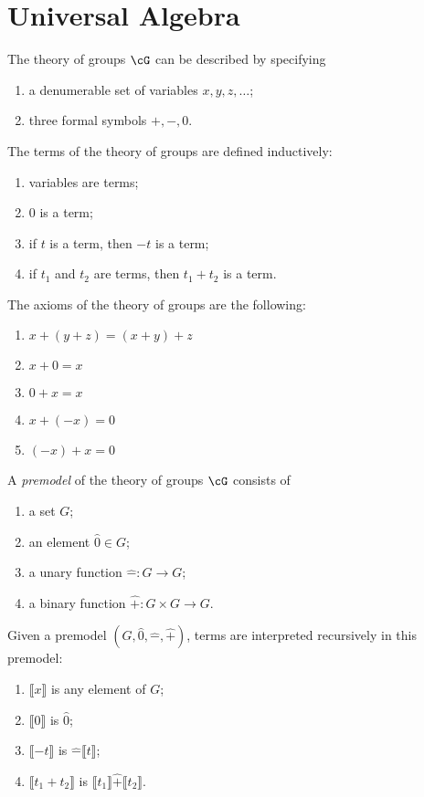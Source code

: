\documentclass{amsart}
\newcommand{\interp}[1]{\llbracket #1 \rrbracket}
\begin{document}
\section{Universal Algebra}
\label{sec:universal-algebra}

The theory of groups $\cG$ can be described by specifying
\begin{enumerate}
\item a denumerable set of variables $x, y, z, \ldots$;
\item three formal symbols $+, -, 0$.
\end{enumerate}

The terms of the theory of groups are defined inductively:
\begin{enumerate}
\item variables are terms;
\item $0$ is a term;
\item if $t$ is a term, then $-t$ is a term;
\item if $t_{1}$ and $t_{2}$ are terms, then $t_{1} + t_{2}$ is a term.
\end{enumerate}

The axioms of the theory of groups are the following:
\begin{enumerate}
\item $x + (y + z) = (x + y) + z$
\item $x + 0 = x$
\item $0 + x = x$
\item $x + (-x) = 0$
\item $(-x) + x = 0$
\end{enumerate}

\begin{defn}
  A \emph{premodel} of the theory of groups $\cG$ consists of
  \begin{enumerate}
  \item a set $G$;
  \item an element $\hat{0} \in G$;
  \item a unary function $\hat{-} : G \to G$;
  \item a binary function $\hat{+} : G \times G \to G$.
  \end{enumerate}
\end{defn}

Given a premodel $(G, \hat{0}, \hat{-}, \hat{+})$, terms are interpreted recursively in this premodel:
\begin{enumerate}
\item $\interp{x}$ is any element of $G$;
\item $\interp{0}$ is $\hat{0}$;
\item $\interp{-t}$ is $\hat{-}\interp{t}$;
\item $\interp{t_{1} + t_{2}}$ is $\interp{t_{1}} \hat{+} \interp{t_{2}}$.
\end{enumerate}
\end{document}
